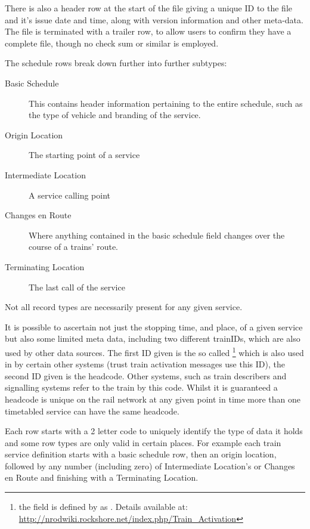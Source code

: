 There is also a header row at the start of the file giving a unique ID to the file and it's issue date and time, along with version information and other meta-data. The file is terminated with a trailer row, to allow users to confirm they have a complete file, though no check sum or similar is employed.

The schedule rows break down further into further subtypes:
\begin{description}
	\item[Basic Schedule] This contains header information pertaining to the entire schedule, such as the type of vehicle and branding of the service.
	\item[Origin Location] The starting point of a service
	\item[Intermediate Location]  A service calling point
	\item[Changes en Route] Where anything contained in the basic schedule field changes over the course of a trains' route.
	\item[Terminating Location] The last call of the service
\end{description}
Not all record types are necessarily present for any given service.

It is possible to ascertain not just the stopping time, and place, of a given service but also some limited meta data, including two different trainIDs, which are also used by other data sources. The first ID given is the so called \footnote{the field is defined by \citet{Hicks} as . Details available at: \url{http://nrodwiki.rockshore.net/index.php/Train_Activation}} which is also used in by certain other systems (trust train activation messages use this ID), the second ID given is the headcode. Other systems, such as train describers and signalling systems refer to the train by this code. Whilst it is guaranteed a headcode is unique on the rail network at any given point in time more than one timetabled service can have the same headcode.

Each row starts with a 2 letter code to uniquely identify the type of data it holds and some row types are only valid in certain places. For example each train service definition starts with a basic schedule row, then an origin location, followed by any number (including zero) of Intermediate Location's or Changes en Route and finishing with a Terminating Location. 

